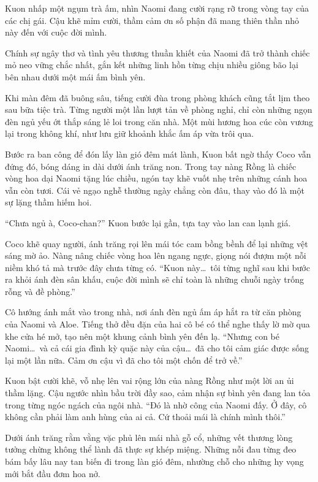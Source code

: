 ﻿\documentclass[../main.tex]{subfiles}
\begin{document}
Kuon nhấp một ngụm trà ấm, nhìn Naomi đang cười rạng rỡ trong vòng tay của các chị gái. Cậu khẽ mỉm cười, thầm cảm ơn số phận đã mang thiên thần nhỏ này đến với cuộc đời mình.

Chính sự ngây thơ và tình yêu thương thuần khiết của Naomi đã trở thành chiếc mỏ neo vững chắc nhất, gắn kết những linh hồn từng chịu nhiều giông bão lại bên nhau dưới một mái ấm bình yên.

\omk

Khi màn đêm đã buông sâu, tiếng cười đùa trong phòng khách cũng tắt lịm theo sau bữa tiệc trà. Từng người một lần lượt tản về phòng nghỉ, chỉ còn những ngọn đèn ngủ yếu ớt thắp sáng lẻ loi trong căn nhà. Một mùi hương hoa cúc còn vương lại trong không khí, như lưu giữ khoảnh khắc ấm áp vừa trôi qua.

Bước ra ban công để đón lấy làn gió đêm mát lành, Kuon bất ngờ thấy Coco vẫn đứng đó, bóng dáng in dài dưới ánh trăng non. Trong tay nàng Rồng là chiếc vòng hoa dại Naomi tặng lúc chiều, ngón tay khẽ vuốt nhẹ trên những cánh hoa vẫn còn tươi. Cái vẻ ngạo nghễ thường ngày chẳng còn đâu, thay vào đó là một sự lặng thầm hiếm hoi.

``Chưa ngủ à, Coco-chan?'' Kuon bước lại gần, tựa tay vào lan can lạnh giá.

Coco khẽ quay người, ánh trăng rọi lên mái tóc cam bồng bềnh để lại những vệt sáng mờ ảo. Nàng nâng chiếc vòng hoa lên ngang ngực, giọng nói đượm một nỗi niềm khó tả mà trước đây chưa từng có. ``Kuon này\dots\ tôi từng nghĩ sau khi bước ra khỏi ánh đèn sân khấu, cuộc đời mình sẽ chỉ toàn là những chuỗi ngày trống rỗng và đề phòng.''

Cô hướng ánh mắt vào trong nhà, nơi ánh đèn ngủ ấm áp hắt ra từ căn phòng của Naomi và Aloe. Tiếng thở đều đặn của hai cô bé có thể nghe thấy lờ mờ qua khe cửa hé mở, tạo nên một khung cảnh bình yên đến lạ. ``Nhưng con bé Naomi\dots\ và cả cái gia đình kỳ quặc này của cậu\dots\ đã cho tôi cảm giác được sống lại một lần nữa. Cảm ơn cậu vì đã cho tôi một chốn để trở về.''

Kuon bật cười khẽ, vỗ nhẹ lên vai rộng lớn của nàng Rồng như một lời an ủi thầm lặng. Cậu ngước nhìn bầu trời đầy sao, cảm nhận sự bình yên đang lan tỏa trong từng ngóc ngách của ngôi nhà. ``Đó là nhờ công của Naomi đấy. Ở đây, cô không cần phải làm anh hùng của ai cả. Cứ thoải mái là chính mình thôi.''

Dưới ánh trăng rằm vằng vặc phủ lên mái nhà gỗ cổ, những vết thương lòng tưởng chừng không thể lành đã thực sự khép miệng. Những nỗi đau từng đeo bám bấy lâu nay tan biến đi trong làn gió đêm, nhường chỗ cho những hy vọng mới bắt đầu đơm hoa nở.
\end{document}

